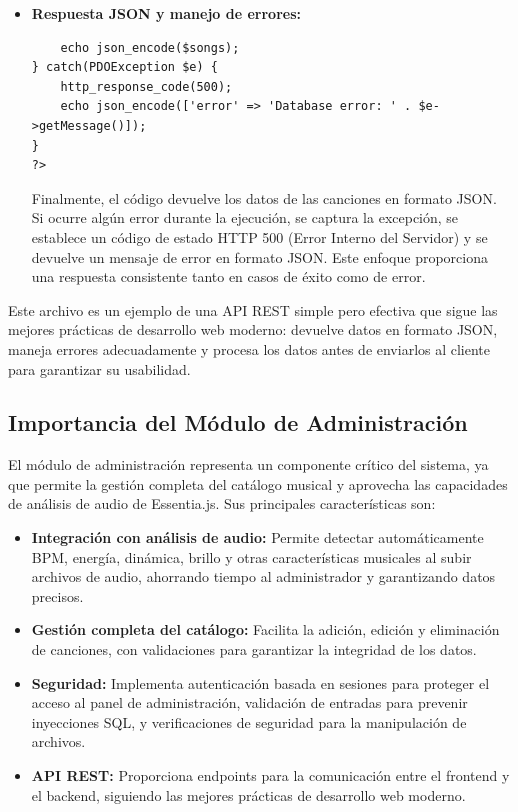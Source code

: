 \documentclass[a4paper,12pt]{article}
\begin{document}
\begin{itemize}
    \item \textbf{Respuesta JSON y manejo de errores:}
    \begin{verbatim}
    echo json_encode($songs);
} catch(PDOException $e) {
    http_response_code(500);
    echo json_encode(['error' => 'Database error: ' . $e->getMessage()]);
}
?>
    \end{verbatim}
    Finalmente, el código devuelve los datos de las canciones en formato JSON. Si ocurre algún error durante la ejecución, se captura la excepción, se establece un código de estado HTTP 500 (Error Interno del Servidor) y se devuelve un mensaje de error en formato JSON. Este enfoque proporciona una respuesta consistente tanto en casos de éxito como de error.
\end{itemize}

Este archivo es un ejemplo de una API REST simple pero efectiva que sigue las mejores prácticas de desarrollo web moderno: devuelve datos en formato JSON, maneja errores adecuadamente y procesa los datos antes de enviarlos al cliente para garantizar su usabilidad.

\subsection{Importancia del Módulo de Administración}

El módulo de administración representa un componente crítico del sistema, ya que permite la gestión completa del catálogo musical y aprovecha las capacidades de análisis de audio de Essentia.js. Sus principales características son:

\begin{itemize}
    \item \textbf{Integración con análisis de audio:} Permite detectar automáticamente BPM, energía, dinámica, brillo y otras características musicales al subir archivos de audio, ahorrando tiempo al administrador y garantizando datos precisos.
    
    \item \textbf{Gestión completa del catálogo:} Facilita la adición, edición y eliminación de canciones, con validaciones para garantizar la integridad de los datos.
    
    \item \textbf{Seguridad:} Implementa autenticación basada en sesiones para proteger el acceso al panel de administración, validación de entradas para prevenir inyecciones SQL, y verificaciones de seguridad para la manipulación de archivos.
    
    \item \textbf{API REST:} Proporciona endpoints para la comunicación entre el frontend y el backend, siguiendo las mejores prácticas de desarrollo web moderno.
\end{itemize}
\end{document}
